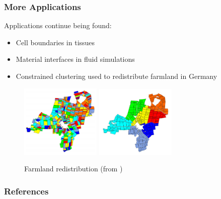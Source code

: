 \documentclass{beamer}
\begin{document}
\begin{frame}
  \frametitle{More Applications}

  Applications continue being found:
  \begin{itemize}
    \item Cell boundaries in tissues \cite{cell}
    \item Material interfaces in fluid simulations \cite{fluids}
    \item Constrained clustering used to redistribute farmland in Germany \cite{brieden_clustering} \cite{brieden_farmland}
  \end{itemize}

  \begin{figure}
    \includegraphics[width=1.5in]{farm1.png}
    \includegraphics[width=1.5in]{farm2.png}
    \caption{Farmland redistribution (from \cite{brieden_farmland})}
  \end{figure}

\end{frame}

\begin{frame}[allowframebreaks]
  \frametitle{References}

  {\footnotesize
  \printbibliography}

\end{frame}
\end{document}

